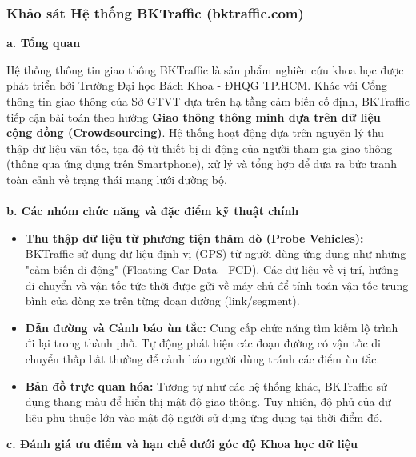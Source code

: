 \subsubsection{Khảo sát Hệ thống BKTraffic (bktraffic.com)}

\textbf{a. Tổng quan}

Hệ thống thông tin giao thông BKTraffic là sản phẩm nghiên cứu khoa học được phát triển bởi Trường Đại học Bách Khoa - ĐHQG TP.HCM. Khác với Cổng thông tin giao thông của Sở GTVT dựa trên hạ tầng cảm biến cố định, BKTraffic tiếp cận bài toán theo hướng \textbf{Giao thông thông minh dựa trên dữ liệu cộng đồng (Crowdsourcing)}. Hệ thống hoạt động dựa trên nguyên lý thu thập dữ liệu vận tốc, tọa độ từ thiết bị di động của người tham gia giao thông (thông qua ứng dụng trên Smartphone), xử lý và tổng hợp để đưa ra bức tranh toàn cảnh về trạng thái mạng lưới đường bộ.\\
\\
\textbf{b. Các nhóm chức năng và đặc điểm kỹ thuật chính}

\begin{itemize}
    \item \textbf{Thu thập dữ liệu từ phương tiện thăm dò (Probe Vehicles):} BKTraffic sử dụng dữ liệu định vị (GPS) từ người dùng ứng dụng như những "cảm biến di động" (Floating Car Data - FCD). Các dữ liệu về vị trí, hướng di chuyển và vận tốc tức thời được gửi về máy chủ để tính toán vận tốc trung bình của dòng xe trên từng đoạn đường (link/segment).
    \item \textbf{Dẫn đường và Cảnh báo ùn tắc:} Cung cấp chức năng tìm kiếm lộ trình đi lại trong thành phố. Tự động phát hiện các đoạn đường có vận tốc di chuyển thấp bất thường để cảnh báo người dùng tránh các điểm ùn tắc.
    \item \textbf{Bản đồ trực quan hóa:} Tương tự như các hệ thống khác, BKTraffic sử dụng thang màu để hiển thị mật độ giao thông. Tuy nhiên, độ phủ của dữ liệu phụ thuộc lớn vào mật độ người sử dụng ứng dụng tại thời điểm đó.
\end{itemize}

\textbf{c. Đánh giá ưu điểm và hạn chế dưới góc độ Khoa học dữ liệu}

